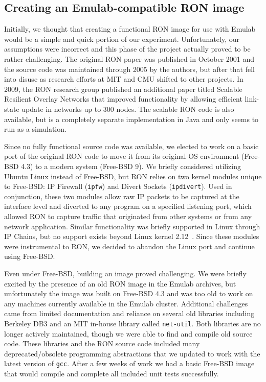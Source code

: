 \subsection{Creating an Emulab-compatible RON image}
\label{sec:ron-image}

Initially, we thought that creating a functional RON image for use with
Emulab would be a simple and quick portion of our experiment.
Unfortunately, our assumptions were incorrect and this phase of the project
actually proved to be rather challenging.  The original RON paper was
published in October 2001 and the source code was maintained through 2005
by the authors, but after that fell into disuse as research efforts at MIT
and CMU shifted to other projects.  In 2009, the RON research group
published an additional paper titled Scalable Resilient Overlay Networks
that improved functionality by allowing efficient link-state update in
networks up to 300 nodes.  The scalable RON code is also available, but is
a completely separate implementation in Java and only seems to run as a
simulation.

Since no fully functional source code was available, we elected to work on
a basic port of the original RON code to move it from its original OS
environment (Free-BSD 4.3) to a modern system (Free-BSD 9).  We briefly
considered utilizing Ubuntu Linux instead of Free-BSD, but RON relies on
two kernel modules unique to Free-BSD: IP Firewall (\texttt{ipfw}) and
Divert Sockets (\texttt{ipdivert}).  Used in conjunction, these two modules
allow raw IP packets to be captured at the interface level and diverted to
any program on a specified listening port, which allowed RON to capture
traffic that originated from other systems or from any network application.
Similar functionality was briefly supported in Linux through IP Chains, but
no support exists beyond Linux kernel 2.12~\cite{Baldine_2000}.  Since
these modules were instrumental to RON, we decided to abandon the Linux
port and continue using Free-BSD.

Even under Free-BSD, building an image proved challenging.  We were briefly
excited by the presence of an old RON image in the Emulab archives, but
unfortunately the image was built on Free-BSD 4.3 and was too old to work
on any machines currently available in the Emulab cluster.  Additional
challenges came from limited documentation and reliance on several old
libraries including Berkeley DB3 and an MIT in-house library called
\texttt{net-util}.  Both libraries are no longer actively maintained,
though we were able to find and compile old source code.  These libraries
and the RON source code included many deprecated/obsolete programming
abstractions that we updated to work with the latest version of
\texttt{gcc}.  After a few weeks of work we had a basic Free-BSD image that
would compile and complete all included unit tests successfully.

